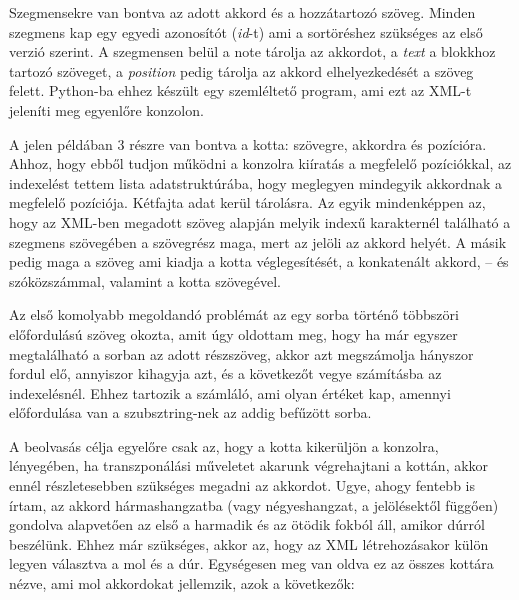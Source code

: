 Szegmensekre van bontva az adott akkord és a hozzátartozó szöveg. Minden szegmens kap egy egyedi azonosítót (\textit{id}-t) ami a sortöréshez szükséges az első verzió szerint. A szegmensen belül a note tárolja az akkordot, a \textit{text} a blokkhoz tartozó szöveget, a \textit{position} pedig tárolja az akkord elhelyezkedését a szöveg felett. Python-ba ehhez készült egy szemléltető program, ami ezt az XML-t jeleníti meg egyenlőre konzolon.


A jelen példában 3 részre van bontva a kotta: szövegre, akkordra és pozícióra. Ahhoz, hogy ebből tudjon  működni a konzolra kiíratás a megfelelő pozíciókkal, az indexelést tettem lista adatstruktúrába, hogy meglegyen mindegyik akkordnak a megfelelő pozíciója. Kétfajta adat kerül tárolásra. Az egyik mindenképpen az, hogy az XML-ben megadott szöveg alapján melyik indexű karakternél található a szegmens szövegében a szövegrész maga, mert az jelöli az akkord helyét. A másik pedig maga a szöveg ami kiadja a kotta véglegesítését, a konkatenált akkord, -- és szóközszámmal, valamint a kotta szövegével.

Az első komolyabb megoldandó problémát az egy sorba történő többszöri előfordulású szöveg okozta, amit úgy oldottam meg, hogy ha már egyszer megtalálható a sorban az adott részszöveg, akkor azt megszámolja hányszor fordul elő, annyiszor kihagyja azt, és a következőt vegye számításba az indexelésnél. Ehhez tartozik a számláló, ami olyan értéket kap, amennyi előfordulása van a szubsztring-nek az addig befűzött sorba.

A beolvasás célja egyelőre csak az, hogy a kotta kikerüljön a konzolra, lényegében, ha transzponálási műveletet akarunk végrehajtani a kottán, akkor ennél részletesebben szükséges megadni az akkordot. Ugye, ahogy fentebb is írtam, az akkord hármashangzatba (vagy négyeshangzat, a jelölésektől függően) gondolva alapvetően az első a harmadik és az ötödik fokból áll, amikor dúrról beszélünk. Ehhez már szükséges, akkor az, hogy az XML létrehozásakor külön legyen választva a mol és a dúr. Egységesen meg van oldva ez az összes kottára nézve, ami mol akkordokat jellemzik, azok a következők:

